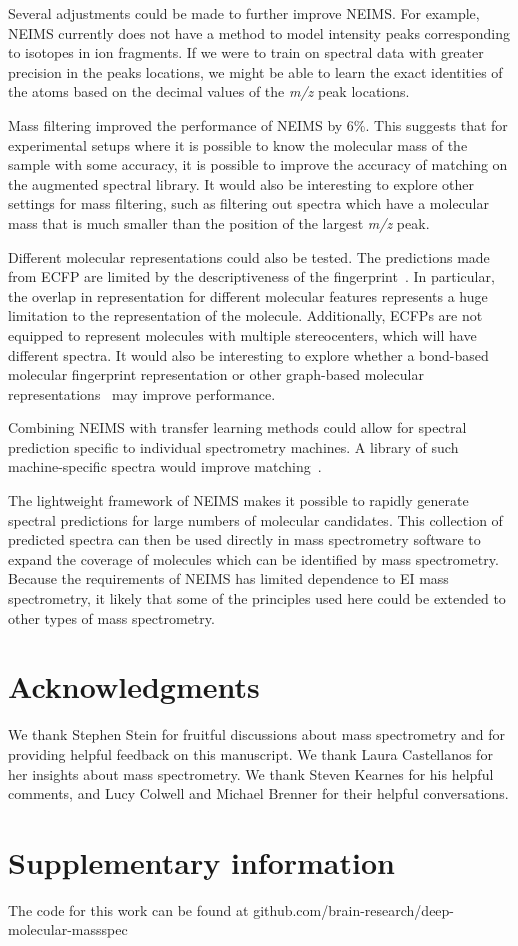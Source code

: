 Several adjustments could be made to further improve NEIMS. For example, NEIMS currently does not have a method to model intensity peaks corresponding to isotopes in ion fragments. If we were to train on spectral data with greater precision in the peaks locations, we might be able to learn the exact identities of the atoms based on the decimal values of the \textit{m/z} peak locations.

Mass filtering improved the performance of NEIMS by 6\%. This suggests that for experimental setups where it is possible to know the molecular mass of the sample with some accuracy, it is possible to improve the accuracy of matching on the augmented spectral library. It would also be interesting to explore other settings for mass filtering, such as filtering out spectra which have a molecular mass that is much smaller than the position of the largest \textit{m/z} peak.

Different molecular representations could also be tested. The predictions made from ECFP are limited by the descriptiveness of the fingerprint~\cite{rdkit_blogpost_collide_bits}. In particular, the overlap in representation for different molecular features represents a huge limitation to the representation of the molecule. Additionally, ECFPs are not equipped to represent molecules with multiple stereocenters, which will have different spectra. It would also be interesting to explore whether a bond-based molecular fingerprint representation \cite{kearnes2016molecular} or other graph-based molecular representations~\cite{duvenaud_convolutional_2015, gilmer_2017_mpnn} may improve performance.

Combining NEIMS with transfer learning methods could allow for spectral prediction specific to individual spectrometry machines. A library of such machine-specific spectra would improve matching~\cite{stein2012MassLibReview}.

The lightweight framework of NEIMS makes it possible to rapidly generate spectral predictions for large numbers of molecular candidates. This collection of predicted spectra can then be used directly in mass spectrometry software to expand the coverage of molecules which can be identified by mass spectrometry. Because the requirements of NEIMS has limited dependence to EI mass spectrometry, it likely that some of the principles used here could be extended to other types of mass spectrometry.


\section{Acknowledgments}
We thank Stephen Stein for fruitful discussions about mass spectrometry and for providing helpful feedback on this manuscript. We thank Laura Castellanos for her insights about mass spectrometry. We thank Steven Kearnes for his helpful comments, and Lucy Colwell and Michael Brenner for their helpful conversations.

\section{Supplementary information}
The code for this work can be found at github.com/brain-research/deep-molecular-massspec
